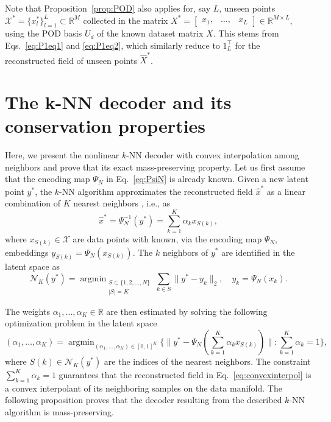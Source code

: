 \documentclass{article}
\DeclareMathOperator*{\argmin}{argmin}
\begin{document}
Note that Proposition~\ref{prop:POD} also applies for, say $L$, unseen points $\mathcal{X}^*=\{x^*_l\}_{l=1}^L\subset \mathbb{R}^M$ collected in the matrix $X^* = \begin{bmatrix} x_1, & \ldots, &x_L \end{bmatrix} \in \mathbb{R}^{M \times L}$, using the POD basis $U_d$ of the known dataset matrix $X$. This stems from Eqs.~\eqref{eq:P1eq1} and \eqref{eq:P1eq2}, which similarly reduce to $1_L^\top$ for the reconstructed field of unseen points $\widehat{X}^*$.

\renewcommand{\theequation}{B.\arabic{equation}}
\renewcommand{\thefigure}{B.\arabic{figure}}
\renewcommand{\thetable}{B.\arabic{table}}
\renewcommand{\theprop}{B.\arabic{prop}}
\renewcommand{\theremark}{B.\arabic{remark}}
\setcounter{equation}{0}
\setcounter{figure}{0}
\setcounter{table}{0}
\setcounter{prop}{0}
\setcounter{remark}{0}
\section{The k-NN decoder and its conservation properties}\label{app:kNN}
Here, we present the nonlinear $k$-NN decoder with convex interpolation among neighbors and prove that its exact mass-preserving property. Let us first assume that the encoding map $\Psi_N$ in Eq.~\eqref{eq:PsiN} is already known. Given a new latent point $y^*$, the $k$-NN algorithm approximates the reconstructed field $\hat{x}^*$ as a linear combination of $K$ nearest neighbors \cite{fix1985discriminatory,Patsatzis_2023}, i.e., as
\begin{equation}
    \hat{x}^*=\Psi^{-1}_N (y^*) = \sum_{k=1}^K \alpha_k x_{S(k)},
    \label{eq:convexinterpol}
\end{equation}
where $x_{S(k)}\in \mathcal{X}$ are data points with known, via the encoding map $\Psi_N$, embeddings $y_{S(k)}=\Psi_N(x_{S(k)})$. The $k$ neighbors of $y^*$ are identified in the latent space as
\begin{equation}
\mathcal{N}_K(y^*) 
= \argmin_{\substack{S \subset \{1,2,\dots,N\} \\ |S|=K}}
\sum_{k \in S}  \| y^* - y_k \|_2 , \quad  y_{k} = \Psi_N (x_{k}).
\end{equation} 

The weights $\alpha_1, \ldots, \alpha_K \in \mathbb{R}$ are then estimated by solving the following optimization problem in the latent space
\begin{equation}
    \left( \alpha_{1}, \ldots, \alpha_{K} \right) = \argmin_{(\alpha_1, \ldots, \alpha_K)\in [0,1]^K} \Bigg\{ \Bigg\| y^* - \Psi_N\left( \sum_{k=1}^K \alpha_k x_{S(k)} \right)\Bigg\| : \sum_{k=1}^K \alpha_k =1 \Bigg\},
    \label{eq:LiftkNN}
\end{equation}
where $S(k) \in \mathcal{N}_K(y^*)$ are the indices of the nearest neighbors. The constraint $\sum_{k=1}^K \alpha_k =1$ guarantees that the reconstructed field in Eq.~\eqref{eq:convexinterpol} is a convex interpolant of its neighboring samples on the data manifold. The following proposition proves that the decoder resulting from the described $k$-NN algorithm is mass-preserving.
\end{document}
